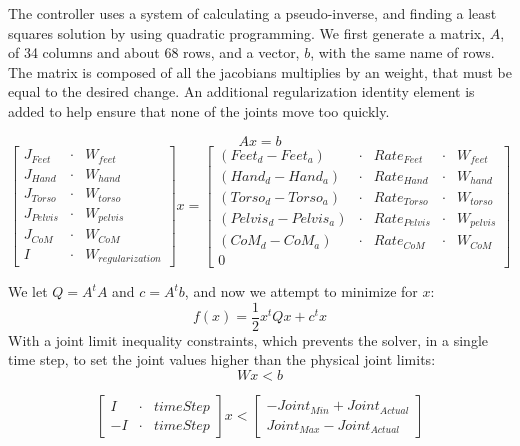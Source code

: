 \documentclass[12pt]{report}
\begin{document}
The controller uses a system of calculating a pseudo-inverse, and finding a least squares solution by using quadratic programming. We first generate a matrix, $A$, of 34 columns and about 68 rows, and a vector, $b$, with the same name of rows. The matrix is composed of all the jacobians multiplies by an weight, that must be equal to the desired change. An additional regularization identity element is added to help ensure that none of the joints move too quickly. 

\begin{equation} 
Ax = b 
\end{equation}
\begin{equation} 
\begin{bmatrix}
J_{Feet} &\cdot & W_{feet} \\
J_{Hand} &\cdot & W_{hand} \\
J_{Torso} &\cdot & W_{torso} \\
J_{Pelvis} &\cdot & W_{pelvis} \\
J_{CoM} &\cdot & W_{CoM} \\
I &\cdot & W_{regularization}
\end{bmatrix}
x = 
\begin{bmatrix}
(Feet_d - Feet_a) &\cdot & {Rate}_{Feet} &\cdot & W_{feet} \\
(Hand_d - Hand_a) &\cdot & {Rate}_{Hand} &\cdot & W_{hand} \\
(Torso_d - Torso_a) &\cdot & {Rate}_{Torso} &\cdot & W_{torso} \\
(Pelvis_d - Pelvis_a) &\cdot & {Rate}_{Pelvis} &\cdot & W_{pelvis} \\
(CoM_d - CoM_a) &\cdot & {Rate}_{CoM} &\cdot & W_{CoM} \\
0
\end{bmatrix}
\end{equation}

We let $Q=A^tA$ and $c=A^tb$, and now we attempt to minimize for $x$:  
\begin{equation} 
f(x) = \frac{1}{2}x^tQx + c^tx 
\end{equation}
With a joint limit inequality constraints, which prevents the solver, in a single time step, to set the joint values higher than the physical joint limits:
\begin{equation} 
Wx<b
\end{equation}

\begin{equation} 
\begin{bmatrix}
I &\cdot & timeStep \\
-I &\cdot & timeStep 
\end{bmatrix}
x
< 
\begin{bmatrix}
-Joint_{Min} + {Joint}_{Actual} \\
Joint_{Max} - {Joint}_{Actual}
\end{bmatrix}
\end{equation}
\end{document}
